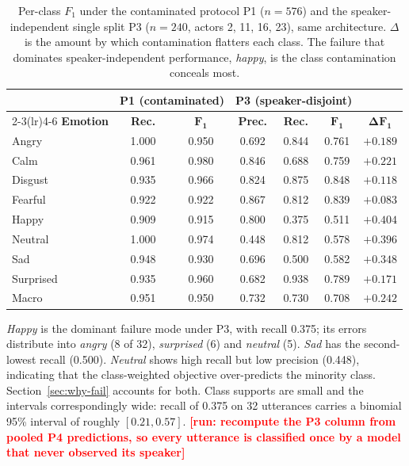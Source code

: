 \documentclass[journal,onecolumn,11pt,draftclsnofoot]{IEEEtran}   %
\newcommand{\TORUN}[1]{\textcolor{red}{\textbf{[run: #1]}}}
\newcommand{\TORUN}[1]{}
\begin{document}
\begin{table}[!t]
\centering\small
\setlength{\tabcolsep}{3.4pt}
\caption{Per-class $F_1$ under the contaminated protocol P1 ($n=576$) and the
speaker-independent single split P3 ($n=240$, actors 2, 11, 16, 23), same
architecture. $\Delta$ is the amount by which contamination flatters each class.
The failure that dominates speaker-independent performance, \emph{happy}, is the
class contamination conceals most.}
\label{tab:perclass}
\begin{tabular}{@{}lcccccc@{}}
\toprule
& \multicolumn{2}{c}{\textbf{P1 (contaminated)}} &
  \multicolumn{3}{c}{\textbf{P3 (speaker-disjoint)}} & \\
\cmidrule(lr){2-3}\cmidrule(lr){4-6}
\textbf{Emotion} & \textbf{Rec.} & $\bm{F_1}$ & \textbf{Prec.} &
\textbf{Rec.} & $\bm{F_1}$ & $\bm{\Delta F_1}$ \\
\midrule
Angry     & 1.000 & 0.950 & 0.692 & 0.844 & 0.761 & $+0.189$ \\
Calm      & 0.961 & 0.980 & 0.846 & 0.688 & 0.759 & $+0.221$ \\
Disgust   & 0.935 & 0.966 & 0.824 & 0.875 & 0.848 & $+0.118$ \\
Fearful   & 0.922 & 0.922 & 0.867 & 0.812 & 0.839 & $+0.083$ \\
Happy     & 0.909 & 0.915 & 0.800 & 0.375 & 0.511 & $\bm{+0.404}$ \\
Neutral   & 1.000 & 0.974 & 0.448 & 0.812 & 0.578 & $+0.396$ \\
Sad       & 0.948 & 0.930 & 0.696 & 0.500 & 0.582 & $+0.348$ \\
Surprised & 0.935 & 0.960 & 0.682 & 0.938 & 0.789 & $+0.171$ \\
\midrule
Macro     & 0.951 & 0.950 & 0.732 & 0.730 & 0.708 & $+0.242$ \\
\bottomrule
\end{tabular}
\end{table}

\emph{Happy} is the dominant failure mode under P3, with recall 0.375; its
errors distribute into \emph{angry} (8 of 32), \emph{surprised} (6) and
\emph{neutral} (5). \emph{Sad} has the second-lowest recall (0.500).
\emph{Neutral} shows high recall but low precision (0.448), indicating that the
class-weighted objective over-predicts the minority class.
Section~\ref{sec:why-fail} accounts for both. Class supports are small and the
intervals correspondingly wide: recall of 0.375 on 32 utterances carries a
binomial 95\% interval of roughly $[0.21, 0.57]$.
\TORUN{recompute the P3 column from pooled P4 predictions, so every utterance is
classified once by a model that never observed its speaker}
\end{document}
